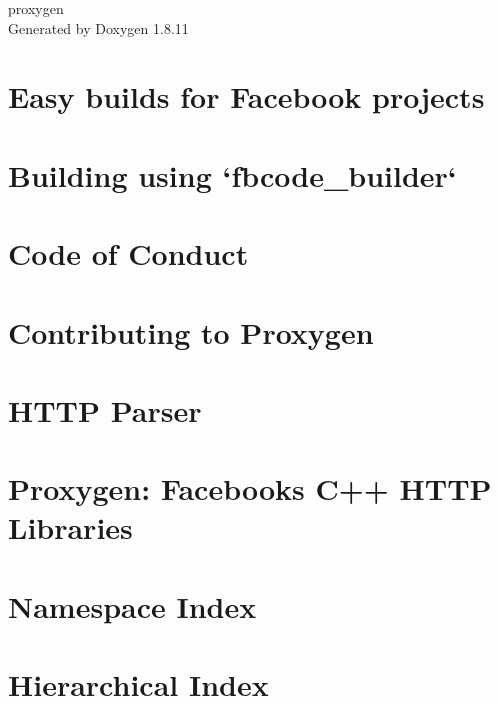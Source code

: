 \documentclass[twoside]{book}
\newcommand{\+}{\discretionary{\mbox{\scriptsize$\hookleftarrow$}}{}{}}
\newcommand{\clearemptydoublepage}{%
  \newpage{\pagestyle{empty}\cleardoublepage}%
}
\begin{document}
\begin{titlepage}
\vspace*{7cm}
\begin{center}%
{\Large proxygen }\\
\vspace*{1cm}
{\large Generated by Doxygen 1.8.11}\\
\end{center}
\end{titlepage}
\clearemptydoublepage
\tableofcontents
\clearemptydoublepage
{}

\chapter{Easy builds for Facebook projects}
\label{md_build_fbcode_builder_README}

\chapter{Building using `fbcode\+\_\+builder`}
\label{md_build_README}

\chapter{Code of Conduct}
\label{md_CODE_OF_CONDUCT}

\chapter{Contributing to Proxygen}
\label{md_CONTRIBUTING}

\chapter{H\+T\+TP Parser}
\label{md_proxygen_external_http_parser_README}

\chapter{Proxygen\+: Facebook\textquotesingle{}s C++ H\+T\+TP Libraries}
\label{md_README}

\chapter{Namespace Index}

\chapter{Hierarchical Index}

\end{document}
